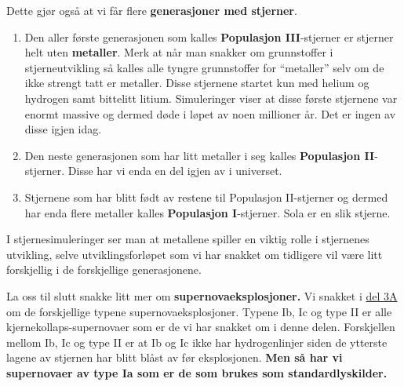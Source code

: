 \documentclass{beamer}
\let\hrefori\href
\renewcommand{\href}[2]{{\setlength{\fboxsep}{1pt}\colorbox{sunset}{\hrefori{#1}{#2}}}}
\newcommand{\pagebutton}[1]{\setbeamertemplate{button}{\tikz\node[inner xsep = 5pt, draw = structure!90, fill = green(ryb), rounded corners = 8pt]{\color{amber}\Large\insertbuttontext};}\beamerbutton{#1}}
\begin{document}
\begin{frame}
{
Dette gjør også at vi får flere {\bf generasjoner med stjerner}.
\begin{enumerate}
\item Den aller første generasjonen som kalles {\bf Populasjon III}-stjerner er stjerner helt uten {\bf metaller}. Merk at når man snakker om grunnstoffer i stjerneutvikling så kalles alle tyngre grunnstoffer for ``metaller'' selv om de ikke strengt tatt er metaller. Disse stjernene startet kun med helium og hydrogen samt bittelitt litium. Simuleringer viser at disse første stjernene var enormt massive og dermed døde i løpet av noen millioner år. Det er ingen av disse igjen idag.
\item Den neste generasjonen som har litt metaller i seg kalles {\bf Populasjon II}-stjerner. Disse har vi enda en del igjen av i universet.
\item Stjernene som har blitt født av restene til Populasjon II-stjerner og dermed har enda flere metaller kalles {\bf Populasjon I}-stjerner. Sola er en slik stjerne.
\end{enumerate}
I stjernesimuleringer ser man at metallene spiller en viktig rolle i stjernenes utvikling, selve utviklingsforløpet som vi har snakket om tidligere vil være litt forskjellig i de forskjellige generasjonene.
\hyperlink{nd2}{\pagebutton{SIDE 52/54/54}}}

{
La oss til slutt snakke litt mer om {\bf supernovaeksplosjoner.} Vi snakket i  \href{https://www.uio.no/studier/emner/matnat/astro/AST2000/h20/undervisningsmateriell/lecture_notes/part1g.pdf}{del 3A} om de forskjellige typene supernovaeksplosjoner. Typene Ib, Ic og type II er alle kjernekollaps-supernovaer som er de vi har snakket om i denne delen. Forskjellen mellom Ib, Ic og type II er at Ib og Ic ikke har hydrogenlinjer siden de ytterste lagene av stjernen har blitt blåst av før eksplosjonen. {\bf Men så har vi supernovaer av type Ia som er de som brukes som standardlyskilder.}
\hyperlink{nd3}{\pagebutton{SIDE 53/54/54}}}



\end{frame}
\end{document}
